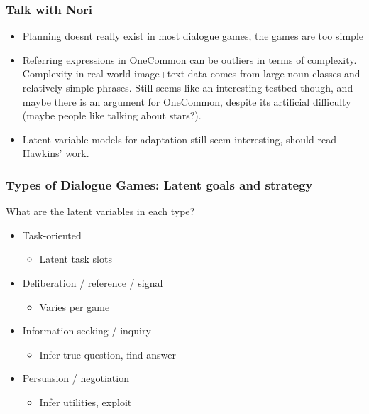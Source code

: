 \documentclass{beamer}
\begin{document}
\begin{frame}
\frametitle{Talk with Nori}
\begin{itemize}
\item Planning doesnt really exist in most dialogue games,
    the games are too simple
\item Referring expressions in OneCommon can be outliers in terms of complexity.
    Complexity in real world image+text data comes from large noun classes
    and relatively simple phrases.
    Still seems like an interesting testbed though,
    and maybe there is an argument for OneCommon,
    despite its artificial difficulty (maybe people like talking about stars?).
\item Latent variable models for adaptation still seem interesting,
    should read Hawkins' work.
\end{itemize}
\end{frame}

\begin{frame}
\frametitle{Types of Dialogue Games: Latent goals and strategy}
What are the latent variables in each type?
\begin{itemize}
\item Task-oriented
    \begin{itemize}
    \item Latent task slots
    \end{itemize}
\item Deliberation / reference / signal
    \begin{itemize}
    \item Varies per game
    \end{itemize}
\item Information seeking / inquiry
    \begin{itemize}
    \item Infer true question, find answer
    \end{itemize}
\item Persuasion / negotiation
    \begin{itemize}
    \item Infer utilities, exploit
    \end{itemize}
\end{itemize}
\end{frame}
\end{document}
